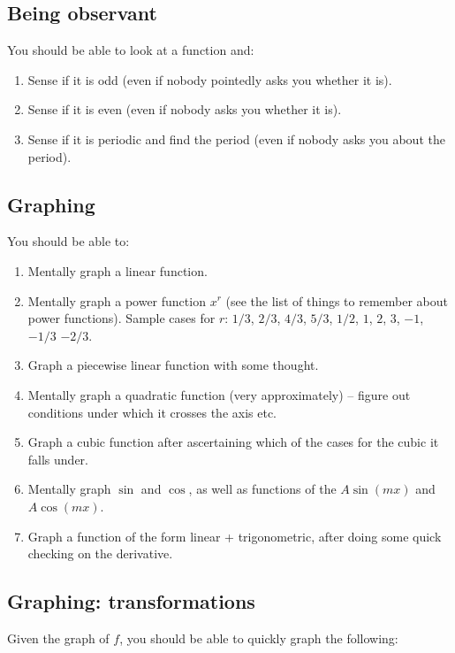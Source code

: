 \documentclass[10pt]{amsart}
\begin{document}
\subsection{Being observant}

You should be able to look at a function and:

\begin{enumerate}
\item Sense if it is odd (even if nobody pointedly asks you whether it
  is).
\item Sense if it is even (even if nobody asks you whether it is).
\item Sense if it is periodic and find the period (even if nobody asks
  you about the period).
\end{enumerate}

\subsection{Graphing}

You should be able to:

\begin{enumerate}
\item Mentally graph a linear function.
\item Mentally graph a power function $x^r$ (see the list of things to
  remember about power functions). Sample cases for $r$: $1/3$, $2/3$,
  $4/3$, $5/3$, $1/2$, $1$, $2$, $3$, $-1$, $-1/3$ $-2/3$.
\item Graph a piecewise linear function with some thought.
\item Mentally graph a quadratic function (very approximately) --
  figure out conditions under which it crosses the axis etc.
\item Graph a cubic function after ascertaining which of the cases for
  the cubic it falls under.
\item Mentally graph $\sin$ and $\cos$, as well as functions of the $A
  \sin(mx)$ and $A\cos(mx)$.
\item Graph a function of the form linear + trigonometric, after doing
  some quick checking on the derivative.
\end{enumerate}

\subsection{Graphing: transformations}

Given the graph of $f$, you should be able to quickly graph the following:
\end{document}
